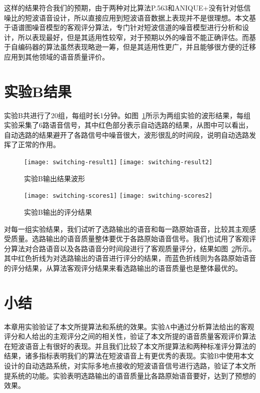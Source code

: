 这样的结果符合我们的预期，由于两种对比算法P.563和ANIQUE+没有针对低信噪比的短波语音设计，所以直接应用到短波语音数据上表现并不是很理想。本文基于语谱图噪音模型的客观评分算法，专门针对短波信道的噪音模型进行分析和设计，所以表现最好，但是其适用性较窄，对于预期以外的噪音不能正确评估。而基于自编码器的算法虽然表现略逊一筹，但是其适用性更广，并且能够很方便的迁移应用到其他领域的语音质量评价。

\section{实验B结果}

实验B共进行了20组，每组时长1分钟。如图~\ref{fig:switching-result}所示为两组实验的波形结果，每组实验采集了6路语音信号，其中红色部分表示自动选路的结果，从图中可以看出，自动选路的结果避开了各路信号中噪音很大，波形很乱的时间段，说明自动选路发挥了正常的作用。

\begin{figure}
\centering
\texttt{[image: switching-result1]}
\texttt{[image: switching-result2]}
\caption{实验B输出结果波形\label{fig:switching-result}}
\end{figure}

\begin{figure}
\centering
\texttt{[image: switching-scores1]}
\texttt{[image: switching-scores2]}
\caption{实验B输出的评分结果\label{fig:switching-scores}}
\end{figure}

对每一组实验结果，我们试听了选路输出的语音和每一路原始语音，比较其主观感受质量。选路输出的语音质量整体要优于各路原始语音信号。我们也试用了客观评分算法对合路语音以及各路语音分时间段进行了客观质量评分，结果如图~\ref{fig:switching-scores}所示。其中红色折线为对选路输出的语音进行评分的结果，而蓝色折线则为各路原始语音的评分结果，从算法客观评分结果来看选路输出的语音质量也是整体最优的。

\section{小结}

本章用实验验证了本文所提算法和系统的效果。实验A中通过分析算法给出的客观评分和人给出的主观评分之间的相关性，验证了本文所提的语音质量客观评价算法在短波语音上有很好的表现。并且我们比较了本文所提算法和两种标准评分算法的结果，诸多指标表明我们的算法在短波语音上有更优秀的表现。实验B中使用本文设计的自动选路系统，对实际多地点接收的短波语音信号进行选路，验证了本文所提系统的功能。实验表明选路输出的语音质量比各路原始语音要好，达到了预想的效果。
